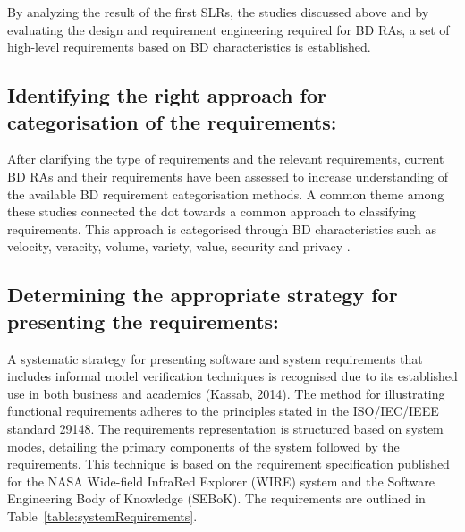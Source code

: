 \documentclass[journal]{IEEEtran}
\begin{document}
By analyzing the result of the first SLRs, the studies discussed above and by evaluating the design and requirement engineering required for BD RAs, a set of high-level requirements based on BD characteristics is established. 

\subsection{Identifying the right approach for categorisation of the requirements:}

After clarifying the type of requirements and the relevant requirements, current BD RAs and their requirements have been assessed to increase understanding of the available BD requirement categorisation methods. A common theme among these studies connected the dot towards a common approach to classifying requirements. This approach is categorised through BD characteristics such as velocity, veracity, volume, variety, value, security and privacy \cite{ataei2022state, Bahrami2015,rad2017big,Chen2016a}.

\subsection{Determining the appropriate strategy for presenting the requirements:} A systematic strategy for presenting software and system requirements that includes informal model verification techniques is recognised due to its established use in both business and academics (Kassab, 2014). The method for illustrating functional requirements adheres to the principles stated in the ISO/IEC/IEEE standard 29148. The requirements representation is structured based on system modes, detailing the primary components of the system followed by the requirements. This technique is based on the requirement specification published for the NASA Wide-field InfraRed Explorer (WIRE) system and the Software Engineering Body of Knowledge (SEBoK). The requirements are outlined in Table~\ref{table:systemRequirements}.
\end{document}
